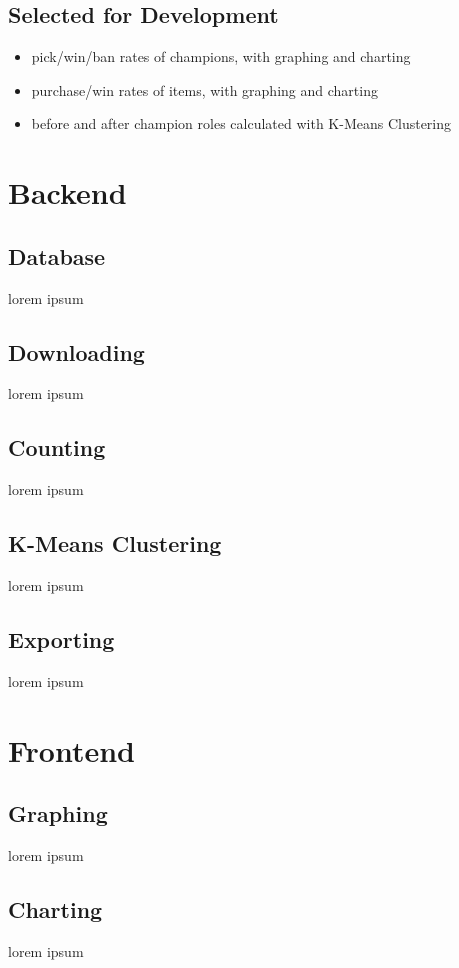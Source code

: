 \documentclass{article}
\begin{document}
\subsection{Selected for Development}
\begin{itemize}
    \item pick/win/ban rates of champions, with graphing and charting
    \item purchase/win rates of items, with graphing and charting
    \item before and after champion roles calculated with K-Means Clustering
\end{itemize}


\section{Backend}

\subsection{Database}
lorem ipsum

\subsection{Downloading}
lorem ipsum

\subsection{Counting}
lorem ipsum

\subsection{K-Means Clustering}
lorem ipsum

\subsection{Exporting}
lorem ipsum



\section{Frontend}

\subsection{Graphing}
lorem ipsum

\subsection{Charting}
lorem ipsum


\end{document}

